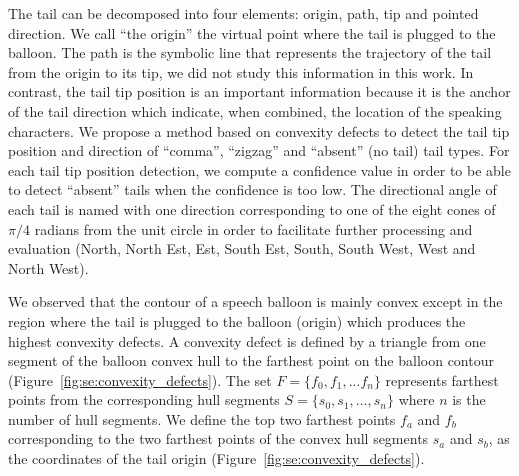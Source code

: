 


The tail can be decomposed into four elements: origin, path, tip and pointed direction.
We call ``the origin'' the virtual point where the tail is plugged to the balloon.
The path is the symbolic line that represents the trajectory of the tail from the origin to its tip, we did not study this information in this work.
In contrast, the tail tip position is an important information because it is the anchor of the tail direction which indicate, when combined, the location of the speaking characters.
We propose a method based on convexity defects to detect the tail tip position and direction of ``comma'', ``zigzag'' and ``absent'' (no tail) tail types.
For each tail tip position detection, we compute a confidence value in order to be able to detect ``absent'' tails when the confidence is too low.
The directional angle of each tail is named with one direction corresponding to one of the eight cones of $\pi/4$ radians from the unit circle in order to facilitate further processing and evaluation (North, North Est, Est, South Est, South, South West, West and North West).

We observed that the contour of a speech balloon is mainly convex except in the region where the tail is plugged to the balloon (origin) which produces the highest convexity defects.
A convexity defect is defined by a triangle from one segment of the balloon convex hull to the farthest point on the balloon contour (Figure~\ref{fig:se:convexity_defects}).
The set $F=\{f_0,f_1,...f_n\}$ represents farthest points from the corresponding hull segments $S=\{s_0, s_1,...,s_n\}$ where $n$ is the number of hull segments.
We define the top two farthest points $f_a$ and $f_b$ corresponding to the two farthest points of the convex hull segments $s_a$ and $s_b$, as the coordinates of the tail origin (Figure~\ref{fig:se:convexity_defects}).

